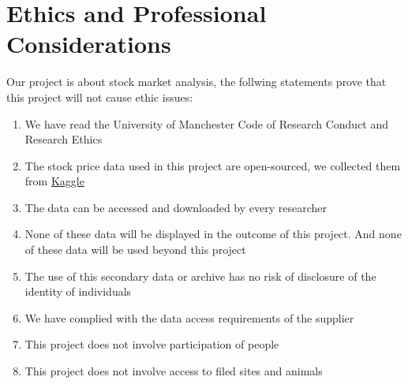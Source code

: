 \chapter{Ethics and Professional Considerations}
\label{ch:ethics}
Our project is about stock market analysis, the follwing statements prove that this project will not cause ethic issues:
\begin{enumerate}
    \item We have read the University of Manchester Code of Research Conduct and Research Ethics
    \item The stock price data used in this project are open-sourced, we collected them from \hyperlink{https://www.kaggle.com/borismarjanovic/price-volume-data-for-all-us-stocks-etfs}{Kaggle}
    \item The data can be accessed and downloaded by every researcher
    \item None of these data will be displayed in the outcome of this project. And none of these data will be used beyond this project
    \item The use of this secondary data or archive has no risk of disclosure of the identity of individuals
    \item We have complied with the data access requirements of the supplier
    \item This project does not involve participation of people
    \item This project does not involve access to filed sites and animals
\end{enumerate}